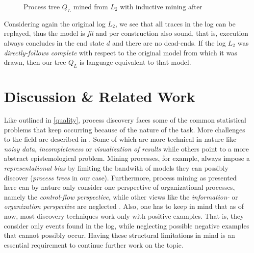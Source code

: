 \documentclass[a4paper]{IEEEtran}
\begin{document}
\begin{figure}[h!]
    \centering
    \usetikzlibrary{graphdrawing.trees}
\caption{ Process tree $Q_L$ mined from $L_2$ with inductive mining after \cite{inductivemining-constructive}}
\label{fig:mined_tree}
\end{figure}
Considering again the original log $L_2$, we see that all traces in the log can be replayed, thus the model is \textit{fit} and per construction also sound, that is, execution always concludes in the end state $d$ and there are no dead-ends. If the log $L_2$ was \textit{directly-follows complete} with respect to the original model from which it was drawn, then our tree $Q_L$ is language-equivalent to that model. 

\section{Discussion \& Related Work}
\label{sec:related}
Like outlined in \ref{quality}, process discovery faces some of the common statistical problems that keep occurring because of the nature of the task. More challenges to the field are described in \cite{van2004processagenda}. Some of which are more technical in nature like \textit{noisy data}, \textit{incompleteness} or \textit{visualization of results} while others point to a more abstract epistemological problem. Mining processes, for example, always impose a \textit{representational bias} by limiting the bandwith of models they can possibly discover (\textit{process trees} in our case). Furthermore, process mining as presented here can by nature only consider one perspective of organizational processes, namely the \textit{control-flow perspective}, while other views like the \textit{information-} or \textit{organization perspective} are neglected \cite{van2004processagenda}. Also, one has to keep in mind that as of now, most discovery techniques work only with positive examples. That is, they consider only events found in the log, while neglecting possible negative examples that cannot possibly occur. 
Having these structural limitations in mind is an essential requirement to continue further work on the topic. 
\end{document}
